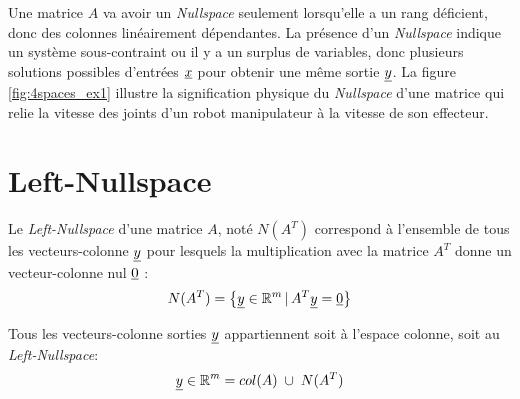 Une matrice $A$ va avoir un \textit{Nullspace} seulement lorsqu'elle a un rang déficient, donc des colonnes linéairement dépendantes. La présence d'un \textit{Nullspace} indique un système sous-contraint ou il y a un surplus de variables, donc plusieurs solutions possibles d'entrées $\underline{x}$ pour obtenir une même sortie $\underline{y}$.
%
%
La figure \ref{fig:4spaces_ex1} illustre la signification physique du \textit{Nullspace} d'une matrice qui relie la vitesse des joints d'un robot manipulateur à la vitesse de son effecteur.

\section{Left-Nullspace}
\label{sec:leftnullspace}

Le \textit{Left-Nullspace} d'une matrice $A$, noté $N(A^T)$ correspond à l'ensemble de tous les vecteurs-colonne $\underline{y}$ pour lesquels la multiplication avec la matrice $A^T$ donne un vecteur-colonne nul $\underline{0}$ :
\begin{align}
	N(A^T) = \left\{ \underline{y} \in \mathbb{R}^m \,|\, A^T\underline{y} = \underline{0} \right\}
\end{align}

Tous les vecteurs-colonne sorties $\underline{y}$ appartiennent soit à l'espace colonne, soit au \textit{Left-Nullspace}:
\begin{align}
	\col{y} \in \re^m = col(A) \; \cup \; N(A^T) %
\end{align}

